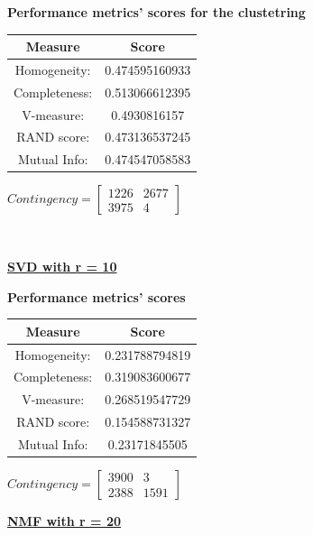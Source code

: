 \documentclass{article}
\begin{document}
\begin{center}
	\textbf{Performance metrics' scores for the clustetring} \\ \vspace{10pt}	
	\begin{tabular}{*{2}{c}}
		\toprule
		\textbf{Measure} & \textbf{Score} \\
		\midrule
		Homogeneity: 		& 0.474595160933 \\
		\midrule
		Completeness: 		& 0.513066612395 \\
		\midrule
		V-measure: 			& 0.4930816157 \\
		\midrule
		RAND score: 		& 0.473136537245 \\
		\midrule
		Mutual Info: 		& 0.474547058583 \\
		\bottomrule
	\end{tabular}
	\qquad
	$Contingency = \left[\begin{array}{*{2}{c}}
		1226 & 2677 \\
		3975 & 4 
		\end{array}\right]
		$
\end{center}
\\ \vspace{20pt}


\underline{\textbf{SVD with r = 10} } 

\begin{center}
	\textbf{Performance metrics' scores} \\ \vspace{10pt}	
	\begin{tabular}{*{2}{c}}
		\toprule
		\textbf{Measure} & \textbf{Score} \\
		\midrule
		Homogeneity: & 0.231788794819 \\
		\midrule
		Completeness: & 0.319083600677 \\
		\midrule
		V-measure: 	& 0.268519547729 \\
		\midrule
		RAND score: & 0.154588731327 \\
		\midrule
		Mutual Info: & 0.23171845505 \\
		\bottomrule
	\end{tabular}
	\qquad
	$Contingency = \left[ \begin{array}{*{2}{c}}
		3900 & 3 \\
		2388 & 1591
		\end{array}\right]
		$
\end{center}
\newpage


\underline{\textbf{NMF with r = 20}} 
\end{document}
